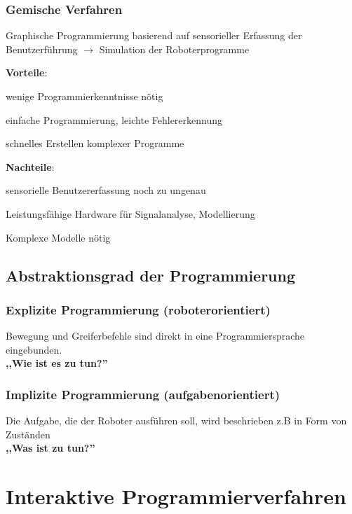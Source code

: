 \subsubsection{Gemische Verfahren}
\begin{compactitem}
    \item Graphische Programmierung basierend auf sensorieller Erfassung der Benutzerführung $\rightarrow$
    Simulation der Roboterprogramme
    \item \textbf{Vorteile}:
    \begin{compactitem}
        \item wenige Programmierkenntnisse nötig
        \item einfache Programmierung, leichte Fehlererkennung
        \item schnelles Erstellen komplexer Programme
    \end{compactitem}
    \item \textbf{Nachteile}:
    \begin{compactitem}
        \item sensorielle Benutzererfassung noch zu ungenau
        \item Leistungsfähige Hardware für Signalanalyse, Modellierung
        \item Komplexe Modelle nötig
    \end{compactitem}
\end{compactitem}
\subsection{Abstraktionsgrad der Programmierung}
\subsubsection{Explizite Programmierung (roboterorientiert)}
Bewegung und Greiferbefehle sind direkt in eine Programmiersprache eingebunden. \\
\textbf{,,Wie ist es zu tun?''}

\subsubsection{Implizite Programmierung (aufgabenorientiert)}
Die Aufgabe, die der Roboter ausführen soll, wird beschrieben z.B in Form von Zuständen \\
\textbf{,,Was ist zu tun?''}
\section{Interaktive Programmierverfahren}

